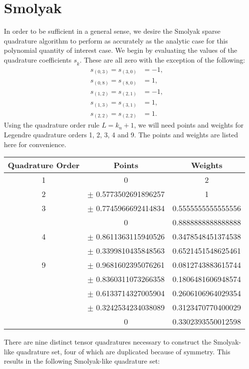 \documentclass[11pt]{article}
\begin{document}
\section{Smolyak}
In order to be sufficient in a general sense, we desire the Smolyak sparse quadrature algorithm to perform
as accurately as the analytic case for this polynomial quantity of interest case.  We begin by evaluating the
values of the quadrature coefficients $s_{\hat k}$.  These are all zero with the exception of the following:
\begin{align}\label{eq:smolyak coeffs}
  s_{(0,3)} = s_{(3,0)} &= -1, \\
  s_{(0,8)} = s_{(8,0)} &=  1, \\
  s_{(1,2)} = s_{(2,1)} &= -1, \\
  s_{(1,3)} = s_{(3,1)} &=  1, \\
  s_{(2,2)} = s_{(2,2)} &=  1.
\end{align}
Using the quadrature order rule $L=k_n+1$, we will need points and weights for Legendre quadrature orders 1,
2, 3, 4 and 9.  The points and weights are listed here for convenience.
\begin{table}[H]
  \centering
  \begin{tabular}{c c c}
    Quadrature Order & Points & Weights \\ \hline
    1 & 0 & 2 \\ \hline
    2 & $\pm$ 0.5773502691896257 & 1\\ \hline
    3 & $\pm$ 0.7745966692414834 & 0.5555555555555556 \\
      & 0                        & 0.8888888888888888 \\ \hline
    4 & $\pm$ 0.8611363115940526 & 0.3478548451374538 \\
      & $\pm$ 0.3399810435848563 & 0.6521451548625461 \\ \hline
    9 & $\pm$ 0.9681602395076261 & 0.0812743883615744 \\
      & $\pm$ 0.8360311073266358 & 0.1806481606948574 \\
      & $\pm$ 0.6133714327005904 & 0.2606106964029354 \\
      & $\pm$ 0.3242534234038089 & 0.3123470770400029 \\
      & 0                        & 0.3302393550012598
  \end{tabular}
\end{table}
There are nine distinct tensor quadratures necessary to construct the Smolyak-like quadrature set, four of
which are duplicated because of symmetry.  This results in the following Smolyak-like quadrature set:
\end{document}

